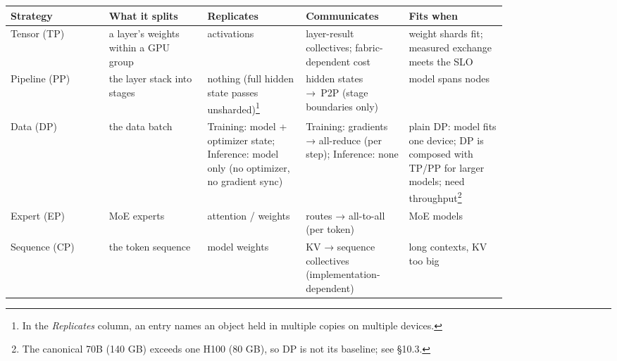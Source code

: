 \nopagebreak[4]
\begin{longtable}[]{@{}
  >{\raggedright\arraybackslash}p{0.1647\linewidth}
  >{\raggedright\arraybackslash}p{0.1647\linewidth}
  >{\raggedright\arraybackslash}p{0.1647\linewidth}
  >{\raggedright\arraybackslash}p{0.1647\linewidth}
  >{\raggedright\arraybackslash}p{0.1647\linewidth}@{}}
\toprule\noalign{}
\begin{minipage}[b]{\linewidth}\raggedright
Strategy
\end{minipage} & \begin{minipage}[b]{\linewidth}\raggedright
What it splits
\end{minipage} & \begin{minipage}[b]{\linewidth}\raggedright
Replicates
\end{minipage} & \begin{minipage}[b]{\linewidth}\raggedright
Communicates
\end{minipage} & \begin{minipage}[b]{\linewidth}\raggedright
Fits when
\end{minipage} \\
\midrule\noalign{}
\endhead
\bottomrule\noalign{}
\endlastfoot
Tensor (TP) & a layer's weights within a GPU group & activations &
layer-result collectives; fabric-dependent cost & weight shards fit;
measured exchange meets the SLO \\
\noalign{\label{tab:10.1}}
Pipeline (PP) & the layer stack into stages & nothing (full hidden state
passes unsharded)\footnote{In the \emph{Replicates} column, an entry
  names an object held in multiple copies on multiple devices.} & hidden
states →~P2P (stage boundaries only) & model spans nodes \\
Data (DP) & the data batch & Training: model + optimizer state;
Inference: model only (no optimizer, no gradient sync) & Training:
gradients → all-reduce (per step); Inference: none & plain DP: model
fits one device; DP is composed with TP/PP for larger models; need
throughput\footnote{The canonical 70B (140 GB) exceeds one H100 (80 GB),
  so DP is not its baseline; see §10.3.} \\
Expert (EP) & MoE experts & attention / weights & routes → all-to-all
(per token) & MoE models \\
Sequence (CP) & the token sequence & model weights & KV → sequence
collectives (implementation-dependent) & long contexts, KV too big \\
\end{longtable}


